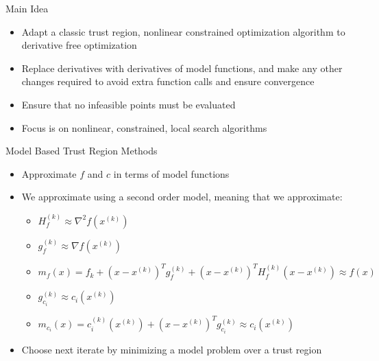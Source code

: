 \documentclass{beamer}
\newcommand{\xk}{{{x}^{(k)}}}
\newcommand{\mk}{{m_f}}
\newcommand{\fk}{{f_k}}
\newcommand{\fgk}{{g^{(k)}_f}}
\newcommand{\fhk}{{H^{(k)}_f}}
\newcommand{\ck}{{c^{(k)}_{i}(\xk)}}
\newcommand{\cgk}{{g^{(k)}_{c_i}}}
\newcommand{\mck}{{m_{c_i}}}
\begin{document}
\begin{frame}{Main Idea}
    \begin{itemize}
        \item Adapt a classic trust region, nonlinear constrained optimization algorithm to derivative free optimization
        \item Replace derivatives with derivatives of model functions, and make any other changes required to avoid extra function calls and ensure convergence
        \item Ensure that no infeasible points must be evaluated
        \item Focus is on nonlinear, constrained, local search algorithms
    \end{itemize}
\end{frame}





\begin{frame}{Model Based Trust Region Methods}
    \begin{itemize}
        \setlength\itemsep{2em}
    	\item Approximate $f$ and $c$ in terms of model functions
    	\item We approximate using a second order model, meaning that we approximate:
    	\begin{itemize}
            \item $\fhk \approx \nabla ^2 f(\xk)$
            \item $\fgk \approx \nabla f(\xk)$
            \item $\mk(x) = \fk + \left(x - \xk \right)^T\fgk + \left(x - \xk \right)^T\fhk\left(x - \xk \right) \approx f(x)$
            \item $\cgk \approx c_i(\xk)$
            \item $\mck(x) = \ck + \left(x - \xk\right)^T\cgk \approx c_i(\xk)$
    	\end{itemize}
	    \item Choose next iterate by minimizing a model problem over a trust region
	\end{itemize}
\end{frame}
\end{document}
